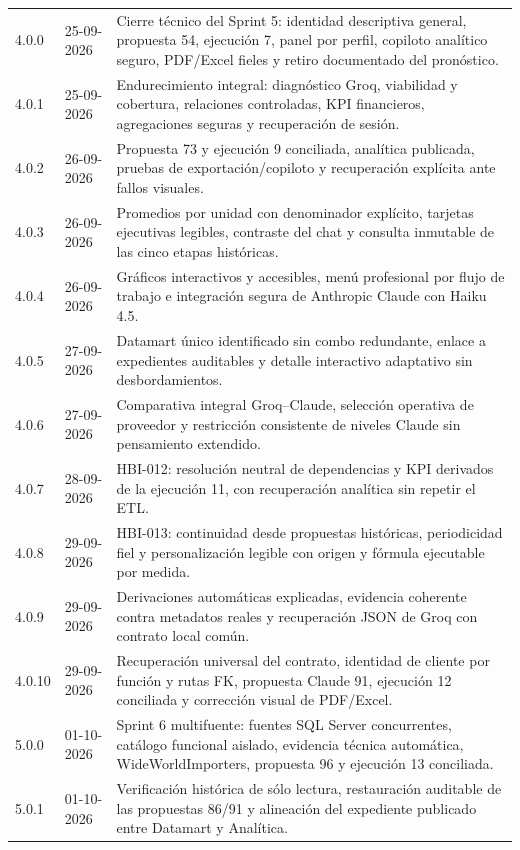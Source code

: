 \documentclass[11pt,letterpaper]{article}
\begin{document}
\begin{longtable}{@{}p{}p{}p{}@{}}
  4.0.0 & 25-09-2026 & Cierre técnico del Sprint 5: identidad descriptiva general, propuesta 54, ejecución 7, panel por perfil, copiloto analítico seguro, PDF/Excel fieles y retiro documentado del pronóstico. \\
  4.0.1 & 25-09-2026 & Endurecimiento integral: diagnóstico Groq, viabilidad y cobertura, relaciones controladas, KPI financieros, agregaciones seguras y recuperación de sesión. \\
  4.0.2 & 26-09-2026 & Propuesta 73 y ejecución 9 conciliada, analítica publicada, pruebas de exportación/copiloto y recuperación explícita ante fallos visuales. \\
  4.0.3 & 26-09-2026 & Promedios por unidad con denominador explícito, tarjetas ejecutivas legibles, contraste del chat y consulta inmutable de las cinco etapas históricas. \\
  4.0.4 & 26-09-2026 & Gráficos interactivos y accesibles, menú profesional por flujo de trabajo e integración segura de Anthropic Claude con Haiku 4.5. \\
  4.0.5 & 27-09-2026 & Datamart único identificado sin combo redundante, enlace a expedientes auditables y detalle interactivo adaptativo sin desbordamientos. \\
  4.0.6 & 27-09-2026 & Comparativa integral Groq--Claude, selección operativa de proveedor y restricción consistente de niveles Claude sin pensamiento extendido. \\
  4.0.7 & 28-09-2026 & HBI-012: resolución neutral de dependencias y KPI derivados de la ejecución 11, con recuperación analítica sin repetir el ETL. \\
  4.0.8 & 29-09-2026 & HBI-013: continuidad desde propuestas históricas, periodicidad fiel y personalización legible con origen y fórmula ejecutable por medida. \\
  4.0.9 & 29-09-2026 & Derivaciones automáticas explicadas, evidencia coherente contra metadatos reales y recuperación JSON de Groq con contrato local común. \\
  4.0.10 & 29-09-2026 & Recuperación universal del contrato, identidad de cliente por función y rutas FK, propuesta Claude 91, ejecución 12 conciliada y corrección visual de PDF/Excel. \\
  5.0.0 & 01-10-2026 & Sprint 6 multifuente: fuentes SQL Server concurrentes, catálogo funcional aislado, evidencia técnica automática, WideWorldImporters, propuesta 96 y ejecución 13 conciliada. \\
  5.0.1 & 01-10-2026 & Verificación histórica de sólo lectura, restauración auditable de las propuestas 86/91 y alineación del expediente publicado entre Datamart y Analítica. \\

\end{longtable}
\end{document}
